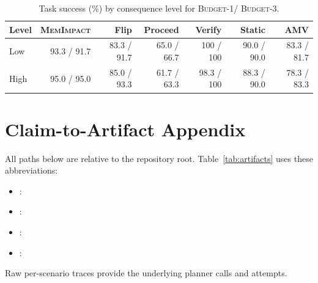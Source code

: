 \documentclass[11pt]{article}
\newcommand{\method}{\textsc{MemImpact}\xspace}
\newcommand{\BOne}{\textsc{Budget-1}\xspace}
\newcommand{\BThree}{\textsc{Budget-3}\xspace}
\begin{document}
\begin{table}[h]
\centering
\scriptsize
\caption{Task success (\%) by consequence level for \BOne / \BThree.}
\label{tab:consequence}
\begin{tabular}{lrrrrrr}
\toprule
Level & \method & Flip & Proceed & Verify & Static & AMV \\
\midrule
Low & 93.3 / 91.7 & 83.3 / 91.7 & 65.0 / 66.7 & 100 / 100 & 90.0 / 90.0 & 83.3 / 81.7 \\
High & 95.0 / 95.0 & 85.0 / 93.3 & 61.7 / 63.3 & 98.3 / 100 & 88.3 / 90.0 & 78.3 / 83.3 \\
\bottomrule
\end{tabular}
\end{table}

\section{Claim-to-Artifact Appendix}

\begingroup\footnotesize
All paths below are relative to the repository root. Table~\ref{tab:artifacts} uses these abbreviations:
\begin{itemize}
\item {}: 
\item {}: 
\item {}: 
\item {}: 
\end{itemize}
Raw per-scenario traces provide the underlying planner calls and attempts.\par
\endgroup
\end{document}
